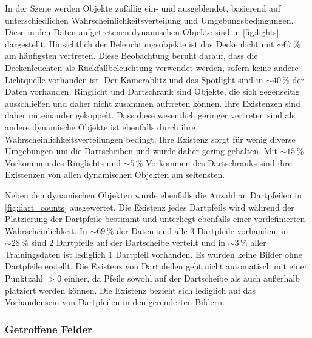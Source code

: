 In der Szene werden Objekte zufällig ein- und ausgeblendet, basierend auf unterschiedlichen Wahrscheinlichkeitsverteilung und Umgebungsbedingungen. Diese in den Daten aufgetretenen dynamischen Objekte sind in \autoref{fig:lights} dargestellt. Hinsichtlich der Beleuchtungsobjekte ist das Deckenlicht mit $\sim67\,\%$ am häufigsten vertreten. Diese Beobachtung beruht darauf, dass die Deckenleuchten als Rückfallbeleuchtung verwendet werden, sofern keine andere Lichtquelle vorhanden ist. Der Kamerablitz und das Spotlight sind in $\sim40\,\%$ der Daten vorhanden. Ringlicht und Dartschrank sind Objekte, die sich gegenseitig ausschließen und daher nicht zusammen auftreten können. Ihre Existenzen sind daher miteinander gekoppelt. Dass diese wesentlich geringer vertreten sind als andere dynamische Objekte ist ebenfalls durch ihre Wahrscheinlichkeitsverteilungen bedingt. Ihre Existenz sorgt für wenig diverse Umgebungen um die Dartscheiben und wurde daher gering gehalten. Mit $\sim15\,\%$ Vorkommen des Ringlichts und $\sim5\,\%$ Vorkommen des Dartschranks sind ihre Existenzen von allen dynamischen Objekten am seltensten.

Neben den dynamischen Objekten wurde ebenfalls die Anzahl an Dartpfeilen in \autoref{fig:dart_counts} ausgewertet. Die Existenz jedes Dartpfeils wird während der Platzierung der Dartpfeile bestimmt und unterliegt ebenfalls einer vordefinierten Wahrscheinlichkeit. In $\sim69\,\%$ der Daten sind alle 3 Dartpfeile vorhanden, in $\sim28\,\%$ sind 2 Dartpfeile auf der Dartscheibe verteilt und in $\sim3\,\%$ aller Trainingsdaten ist lediglich 1 Dartpfeil vorhanden. Es wurden keine Bilder ohne Dartpfeile erstellt. Die Existenz von Dartpfeilen geht nicht automatisch mit einer Punktzahl $>0$ einher, da Pfeile sowohl auf der Dartscheibe als auch außerhalb platziert werden können. Die Existenz bezieht sich lediglich auf das Vorhandensein von Dartpfeilen in den gerenderten Bildern.

\subsubsection{Getroffene Felder}
\label{sec:felder_ergebnisse}

